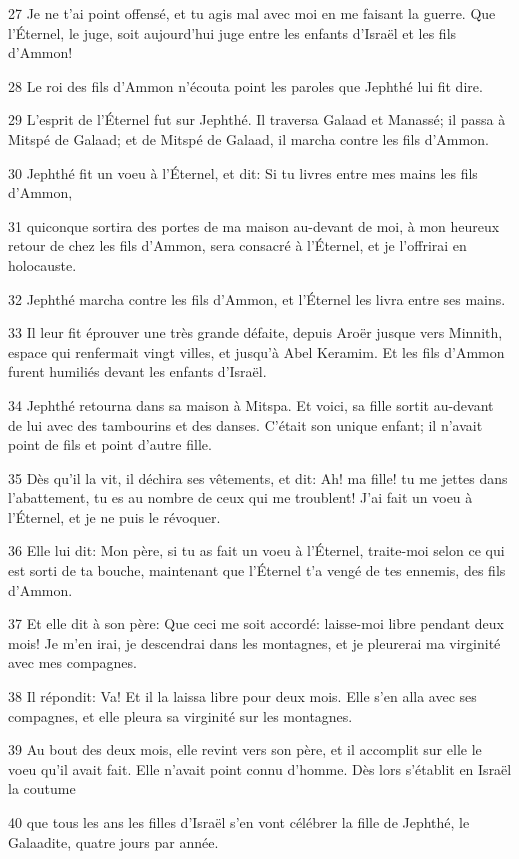 \par 27 Je ne t'ai point offensé, et tu agis mal avec moi en me faisant la guerre. Que l'Éternel, le juge, soit aujourd'hui juge entre les enfants d'Israël et les fils d'Ammon!
\par 28 Le roi des fils d'Ammon n'écouta point les paroles que Jephthé lui fit dire.
\par 29 L'esprit de l'Éternel fut sur Jephthé. Il traversa Galaad et Manassé; il passa à Mitspé de Galaad; et de Mitspé de Galaad, il marcha contre les fils d'Ammon.
\par 30 Jephthé fit un voeu à l'Éternel, et dit: Si tu livres entre mes mains les fils d'Ammon,
\par 31 quiconque sortira des portes de ma maison au-devant de moi, à mon heureux retour de chez les fils d'Ammon, sera consacré à l'Éternel, et je l'offrirai en holocauste.
\par 32 Jephthé marcha contre les fils d'Ammon, et l'Éternel les livra entre ses mains.
\par 33 Il leur fit éprouver une très grande défaite, depuis Aroër jusque vers Minnith, espace qui renfermait vingt villes, et jusqu'à Abel Keramim. Et les fils d'Ammon furent humiliés devant les enfants d'Israël.
\par 34 Jephthé retourna dans sa maison à Mitspa. Et voici, sa fille sortit au-devant de lui avec des tambourins et des danses. C'était son unique enfant; il n'avait point de fils et point d'autre fille.
\par 35 Dès qu'il la vit, il déchira ses vêtements, et dit: Ah! ma fille! tu me jettes dans l'abattement, tu es au nombre de ceux qui me troublent! J'ai fait un voeu à l'Éternel, et je ne puis le révoquer.
\par 36 Elle lui dit: Mon père, si tu as fait un voeu à l'Éternel, traite-moi selon ce qui est sorti de ta bouche, maintenant que l'Éternel t'a vengé de tes ennemis, des fils d'Ammon.
\par 37 Et elle dit à son père: Que ceci me soit accordé: laisse-moi libre pendant deux mois! Je m'en irai, je descendrai dans les montagnes, et je pleurerai ma virginité avec mes compagnes.
\par 38 Il répondit: Va! Et il la laissa libre pour deux mois. Elle s'en alla avec ses compagnes, et elle pleura sa virginité sur les montagnes.
\par 39 Au bout des deux mois, elle revint vers son père, et il accomplit sur elle le voeu qu'il avait fait. Elle n'avait point connu d'homme. Dès lors s'établit en Israël la coutume
\par 40 que tous les ans les filles d'Israël s'en vont célébrer la fille de Jephthé, le Galaadite, quatre jours par année.


